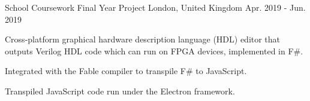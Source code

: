\begin{cventries}
    \cventry
    {School Coursework} %
    {Final Year Project} %
    {London, United Kingdom} %
    {Apr. 2019 - Jun. 2019} %
    {
      \begin{cvitems} %
        \item {Cross-platform graphical hardware description language (HDL) editor that outputs Verilog HDL code which can run on FPGA devices, implemented in F\#.}
        \item {Integrated with the Fable compiler to transpile F\# to JavaScript.}
        \item {Transpiled JavaScript code run under the Electron framework.}
      \end{cvitems}
    }

\end{cventries}